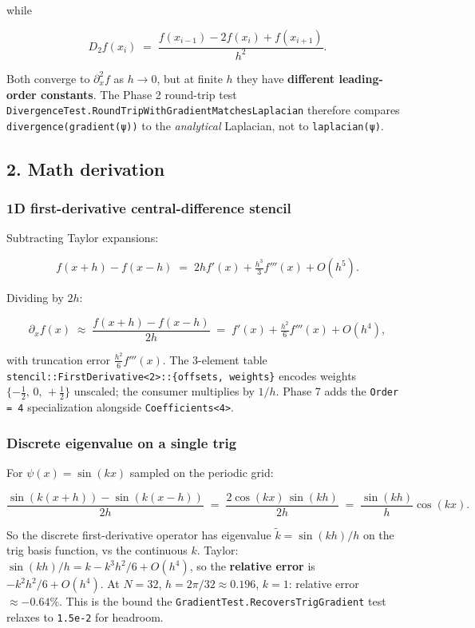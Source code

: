 while

\[
D_2 f(x_i) \;=\; \frac{f(x_{i-1}) - 2 f(x_i) + f(x_{i+1})}{h^2}.
\]

Both converge to \(\partial_x^2 f\) as \(h \to 0\), but at finite \(h\)
they have \textbf{different leading-order constants}. The Phase 2
round-trip test
\passthrough{\lstinline!DivergenceTest.RoundTripWithGradientMatchesLaplacian!}
therefore compares \passthrough{\lstinline!divergence(gradient(ψ))!} to
the \emph{analytical} Laplacian, not to
\passthrough{\lstinline!laplacian(ψ)!}.

\subsection{2. Math derivation}\label{math-derivation}

\subsubsection{1D first-derivative central-difference
stencil}\label{d-first-derivative-central-difference-stencil}

Subtracting Taylor expansions:

\[
f(x + h) - f(x - h) \;=\; 2 h f'(x) + \tfrac{h^3}{3} f'''(x) + O(h^5).
\]

Dividing by \(2h\):

\[
\partial_x f(x) \;\approx\; \frac{f(x + h) - f(x - h)}{2 h}
\;=\; f'(x) + \tfrac{h^2}{6} f'''(x) + O(h^4),
\]

with truncation error \(\tfrac{h^2}{6} f'''(x)\). The 3-element table
\passthrough{\lstinline!stencil::FirstDerivative<2>::\{offsets, weights\}!}
encodes weights \(\{-\tfrac{1}{2},\, 0,\, +\tfrac{1}{2}\}\) unscaled;
the consumer multiplies by \(1/h\). Phase 7 adds the
\passthrough{\lstinline!Order = 4!} specialization alongside
\passthrough{\lstinline!Coefficients<4>!}.

\subsubsection{Discrete eigenvalue on a single
trig}\label{discrete-eigenvalue-on-a-single-trig}

For \(\psi(x) = \sin(k x)\) sampled on the periodic grid:

\[
\frac{\sin(k(x + h)) - \sin(k(x - h))}{2 h} \;=\; \frac{2 \cos(k x)\,\sin(k h)}{2 h} \;=\; \frac{\sin(k h)}{h} \cos(k x).
\]

So the discrete first-derivative operator has eigenvalue
\(\tilde{k} = \sin(k h)/h\) on the trig basis function, vs the
continuous \(k\). Taylor: \(\sin(k h)/h = k - k^3 h^2 / 6 + O(h^4)\), so
the \textbf{relative error} is \(-k^2 h^2 / 6 + O(h^4)\). At \(N = 32\),
\(h = 2\pi/32 \approx 0.196\), \(k = 1\): relative error
\(\approx -0.64\%\). This is the bound the
\passthrough{\lstinline!GradientTest.RecoversTrigGradient!} test relaxes
to \passthrough{\lstinline!1.5e-2!} for headroom.

